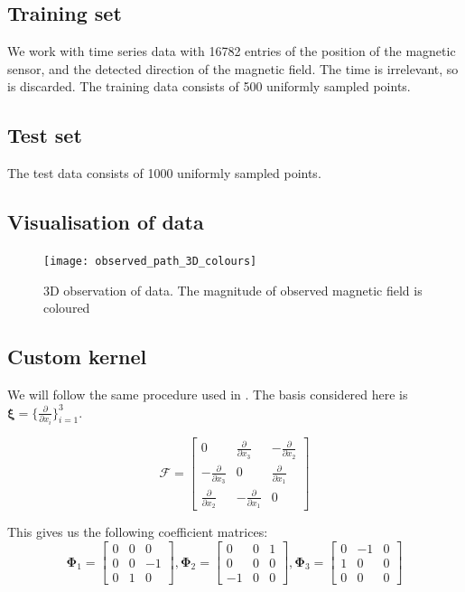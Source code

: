 \documentclass[12pt,a4paper,twoside]{report}
\theoremstyle{definition}
\begin{document}
\subsection{Training set}
We work with time series data with 16782 entries of the position of the magnetic sensor, and the detected direction of the magnetic field. The time is irrelevant, so is discarded. The training data consists of 500 uniformly sampled points.

\subsection{Test set}
The test data consists of 1000 uniformly sampled points.

\subsection{Visualisation of data}
\begin{figure}[ht]
	\centering
	\texttt{[image: observed\_path\_3D\_colours]}
	\caption{3D observation of data. The magnitude of observed magnetic field is coloured}
\end{figure}

\subsection{Custom kernel}
We will follow the same procedure used in . The basis considered here is $\boldsymbol \xi = \{\frac{\partial}{\partial x_i}\}_{i=1}^3$.

$$\mathscr F = \begin{bmatrix} 0 & \frac{\partial}{\partial x_3} & -\frac{\partial}{\partial x_2} \\ -\frac{\partial}{\partial x_3} & 0 & \frac{\partial}{\partial x_1} \\ \frac{\partial}{\partial x_2} & -\frac{\partial}{\partial x_1} & 0 \end{bmatrix}$$

This gives us the following coefficient matrices:
$$\boldsymbol \Phi_1 = \begin{bmatrix}  0&0&0\\0&0&-1\\0&1&0 \end{bmatrix} , \boldsymbol \Phi_2 = \begin{bmatrix} 0&0&1\\0&0&0\\-1&0&0 \end{bmatrix}, \boldsymbol \Phi_3 = \begin{bmatrix} 0&-1&0\\1&0&0\\0&0&0 \end{bmatrix}$$
\end{document}
